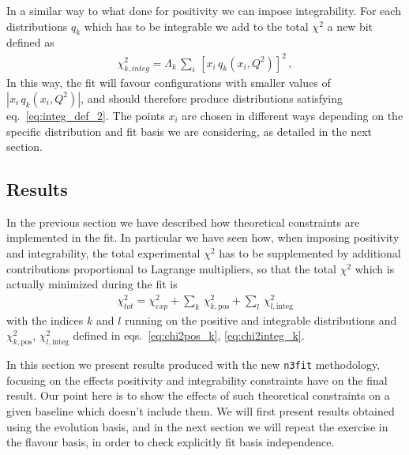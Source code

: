 %
In a similar way to what done for positivity we can impose integrability. 
For each distributions $q_k$ which has to be integrable we
add to the total $\chi^2$ a new bit defined as  
\begin{align}
	\label{eq:chi2integ_k}
	\chi^2_{k,integ} = \Lambda_k \,\sum_i \,\left[x_i\,q_k\left(x_i,Q^2\right)\right]^2\,,
\end{align}
In this way, the fit will favour configurations with smaller values of $|x_i\,q_k\left(x_i,Q^2\right)|$, and should 
therefore produce distributions satisfying eq.~\eqref{eq:integ_def_2}. The points $x_i$ are chosen in different ways depending
on the specific distribution and fit basis we are considering, as detailed in the next section. 


\subsection{Results}
\label{sec:results_nnpdf}
In the previous section we have described how theoretical constraints are implemented in the fit.
In particular we have seen how, when imposing positivity and integrability,
the total experimental $\chi^2$ has to be supplemented by additional contributions
proportional to Lagrange multipliers, so that the total $\chi^2$ which is actually minimized
during the fit is 
\begin{align}
	\label{eq:chi2pos_integ}
	\chi^2_{tot} = \chi^2_{exp} + \sum_k\, \chi^2_{k,\text{pos}} + \sum_l\, \chi^2_{l,\text{integ}}
\end{align}
with the indices $k$ and $l$ running on the positive and integrable distributions
and $\chi^2_{k,\text{pos}}$, $\chi^2_{l,\text{integ}}$ defined in eqs.~\eqref{eq:chi2pos_k}, \eqref{eq:chi2integ_k}.

%
In this section we present results produced with the new {\tt n3fit} methodology,
focusing on the effects positivity and integrability constraints have on the final result.
Our point here is to show the effects of such theoretical constraints on a given baseline which doesn't 
include them. We will first present results obtained using the evolution basis, and in the
next section we will repeat the exercise in the flavour basis, in order to check explicitly 
fit basis independence.

